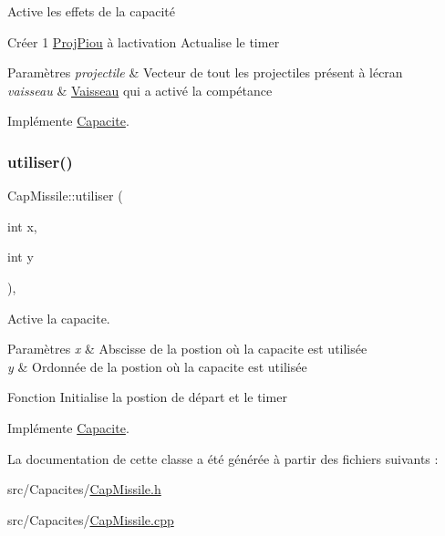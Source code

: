 Active les effets de la capacité 

Créer 1 \hyperlink{class_proj_piou}{Proj\+Piou} à l\textquotesingle{}activation Actualise le timer 
\begin{DoxyParams}{Paramètres}
{\em projectile} & Vecteur de tout les projectiles présent à l\textquotesingle{}écran \\
\hline
{\em vaisseau} & \hyperlink{class_vaisseau}{Vaisseau} qui a activé la compétance \\
\hline
\end{DoxyParams}


Implémente \hyperlink{class_capacite_a75c9621d7a704fedb10ad29c6a697d64}{Capacite}.

\mbox{\label{class_cap_missile_a4ba082615a3721083142549a4c8216ad}} 
\subsubsection{\texorpdfstring{utiliser()}{utiliser()}}
{\footnotesize\ttfamily Cap\+Missile\+::utiliser (\begin{DoxyParamCaption}\item[{int}]{x,  }\item[{int}]{y }\end{DoxyParamCaption})\hspace{0.3cm}{\ttfamily [override]}, {\ttfamily [virtual]}}



Active la capacite. 


\begin{DoxyParams}{Paramètres}
{\em x} & Abscisse de la postion où la capacite est utilisée \\
\hline
{\em y} & Ordonnée de la postion où la capacite est utilisée\\
\hline
\end{DoxyParams}
Fonction Initialise la postion de départ et le timer 

Implémente \hyperlink{class_capacite_a6f5e6efda11f80ab8538e23f5bdc6e79}{Capacite}.



La documentation de cette classe a été générée à partir des fichiers suivants \+:\begin{DoxyCompactItemize}
\item 
src/\+Capacites/\hyperlink{_cap_missile_8h}{Cap\+Missile.\+h}\item 
src/\+Capacites/\hyperlink{_cap_missile_8cpp}{Cap\+Missile.\+cpp}\end{DoxyCompactItemize}
